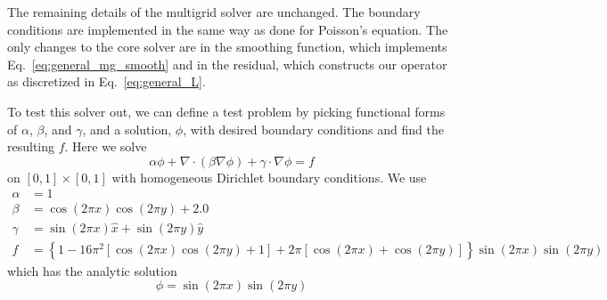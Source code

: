The remaining details of the multigrid solver are unchanged.  The boundary
conditions are implemented in the same way as done for Poisson's equation.
The only changes to the core solver are in the smoothing function, which
implements Eq.~\ref{eq:general_mg_smooth} and in the residual, which
constructs our operator as discretized in Eq.~\ref{eq:general_L}.

To test this solver out, we can define a test problem by picking functional
forms of $\alpha$, $\beta$, and $\gamma$, and a solution, $\phi$, with
desired boundary conditions and find the resulting $f$.  Here we solve
\begin{equation}
\alpha \phi + \nabla \cdot (\beta \nabla \phi) + \gamma \cdot \nabla \phi = f
\end{equation}
on $[0,1]\times[0,1]$ with homogeneous Dirichlet boundary conditions.  We
use
\begin{align}
\alpha &= 1 \\
\beta  &= \cos{(2 \pi x)} \cos{(2 \pi y)} + 2.0 \\
\gamma &= \sin(2\pi x) \hat{x} + \sin(2\pi y) \hat{y} \\
f      &= \left\{1-16 \pi^2 \left[\cos{(2 \pi x)} \cos{(2 \pi y)} + 1\right]
           + 2\pi \left[\cos{(2 \pi x)} + \cos{(2 \pi y)}\right]\right\} \sin{(2 \pi x)} \sin{(2 \pi y)}
\end{align}
which has the analytic solution
\begin{equation}
\phi = \sin{(2 \pi x)} \sin{(2 \pi y)}
\end{equation}

